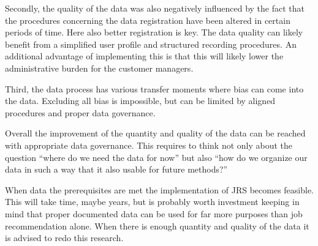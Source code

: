 Secondly, the quality of the data was also negatively influenced by the fact that the procedures concerning the data registration have been altered in certain periods of time.
Here also better registration is key.
The data quality can likely benefit from a simplified user profile and structured recording procedures. 
An additional advantage of implementing this is that this will likely lower the administrative burden for the customer managers.

Third, the data process has various transfer moments where bias can come into the data. 
Excluding all bias is impossible, but can be limited by aligned procedures and proper data governance.

Overall the improvement of the quantity and quality of the data can be reached with appropriate data governance. 
This requires to think not only about the question “where do we need the data for now” but also “how do we organize our data in such a way that it also usable for future methods?”

When data the prerequisites are met the implementation of JRS becomes feasible.
This will take time, maybe years, but is probably worth investment keeping in mind that proper documented data can be used for far more purposes than job recommendation alone.
When there is enough quantity and quality of the data it is advised to redo this research. 

